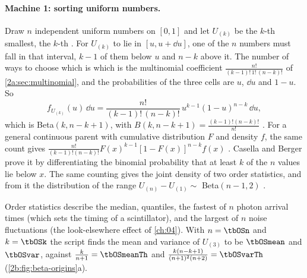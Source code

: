 \paragraph{Machine 1: sorting uniform numbers.} Draw $n$ independent uniform numbers on $[0,1]$ and let $U_{(k)}$ be the $k$-th smallest, the $k$-th . For $U_{(k)}$ to lie in $[u,u+\dd u]$, one of the $n$ numbers must fall in that interval, $k-1$ of them below $u$ and $n-k$ above it. The number of ways to choose which is which is the multinomial coefficient $\frac{n!}{(k-1)!\,1!\,(n-k)!}$ of \cref{2a:sec:multinomial}, and the probabilities of the three cells are $u$, $\dd u$ and $1-u$. So
\begin{equation}
  f_{U_{(k)}}(u)\,\dd u=\frac{n!}{(k-1)!\,(n-k)!}\,u^{k-1}(1-u)^{n-k}\,\dd u ,
  \label{2b:eq:orderstat}
\end{equation}
which is Beta$(k,n-k+1)$, with $B(k,n-k+1)=\frac{(k-1)!(n-k)!}{n!}$ . For a general continuous parent with cumulative distribution $F$ and density $f$, the same count gives $\frac{n!}{(k-1)!(n-k)!}F(x)^{k-1}[1-F(x)]^{n-k}f(x)$ . Casella and Berger prove it by differentiating the binomial probability that at least $k$ of the $n$ values lie below $x$. The same counting gives the joint density of two order statistics, and from it the distribution of the range $U_{(n)}-U_{(1)}\sim$ Beta$(n-1,2)$ . 

Order statistics describe the median, quantiles, the fastest of $n$ photon arrival times (which sets the timing of a scintillator), and the largest of $n$ noise fluctuations (the look-elsewhere effect of \cref{ch:04}). With $n=\tbOSn$ and $k=\tbOSk$ the script finds the mean and variance of $U_{(3)}$ to be $\tbOSmean$ and $\tbOSvar$, against $\frac{k}{n+1}=\tbOSmeanTh$ and $\frac{k(n-k+1)}{(n+1)^2(n+2)}=\tbOSvarTh$ (\cref{2b:fig:beta-origins}a).

